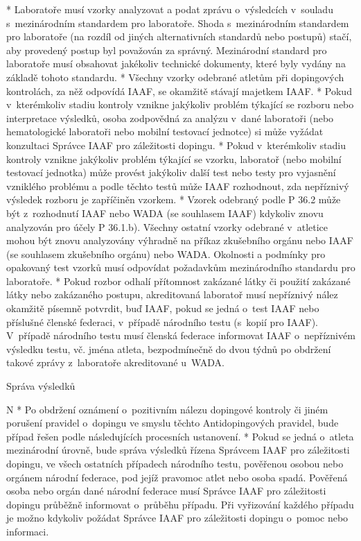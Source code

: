   * Laboratoře musí vzorky analyzovat a podat zprávu o~výsledcích v~souladu s~mezinárodním standardem pro laboratoře. Shoda s~mezinárodním standardem pro laboratoře (na rozdíl od jiných alternativních standardů nebo postupů) stačí, aby provedený postup byl považován za správný. Mezinárodní standard pro laboratoře musí obsahovat jakékoliv technické dokumenty, které byly vydány na základě tohoto standardu.
  \enditems
* Všechny vzorky odebrané atletům při dopingových kontrolách, za něž odpovídá IAAF, se okamžitě stávají majetkem IAAF.
* Pokud v~kterémkoliv stadiu kontroly vznikne jakýkoliv problém týkající se rozboru nebo interpretace výsledků, osoba zodpovědná za analýzu v~dané laboratoři (nebo hematologické laboratoři nebo mobilní testovací jednotce) si může vyžádat konzultaci Správce IAAF pro záležitosti dopingu.
* Pokud v~kterémkoliv stadiu kontroly vznikne jakýkoliv problém týkající se vzorku, laboratoř (nebo mobilní testovací jednotka) může provést jakýkoliv další test nebo testy pro vyjasnění vzniklého problému a podle těchto testů může IAAF rozhodnout, zda nepříznivý výsledek rozboru je zapříčiněn vzorkem.
* Vzorek odebraný podle P 36.2 může být z~rozhodnutí IAAF nebo WADA (se souhlasem IAAF) kdykoliv znovu analyzován pro účely P 36.1.b). Všechny ostatní vzorky odebrané v~atletice mohou být znovu analyzovány výhradně na příkaz zkušebního orgánu nebo IAAF (se souhlasem zkušebního orgánu) nebo WADA. Okolnosti a podmínky pro opakovaný test vzorků musí odpovídat požadavkům mezinárodního standardu pro laboratoře.
* Pokud rozbor odhalí přítomnost zakázané látky či použití zakázané látky nebo zakázaného postupu, akreditovaná laboratoř musí nepříznivý nález okamžitě písemně potvrdit, buď IAAF, pokud se jedná o~test IAAF nebo příslušné členské federaci, v~případě národního testu (s~kopií pro IAAF). V~případě národního testu musí členská federace informovat IAAF o~nepříznivém výsledku testu, vč. jména atleta, bezpodmínečně do dvou týdnů po obdržení takové zprávy z~laboratoře akreditované u~WADA.
\enditems

\secc Správa výsledků

\begitems \style N
* Po obdržení oznámení o~pozitivním nálezu dopingové kontroly či jiném porušení pravidel o~dopingu ve smyslu těchto Antidopingových pravidel, bude případ řešen podle následujících procesních ustanovení.
* Pokud se jedná o~atleta mezinárodní úrovně, bude správa výsledků řízena Správcem IAAF pro záležitosti dopingu, ve všech ostatních případech národního testu, pověřenou osobou nebo orgánem národní federace, pod jejíž pravomoc atlet nebo osoba spadá. Pověřená osoba nebo orgán dané národní federace musí Správce IAAF pro záležitosti dopingu průběžně informovat o~průběhu případu. Při vyřizování každého případu je možno kdykoliv požádat Správce IAAF pro záležitosti dopingu o~pomoc nebo informaci.

